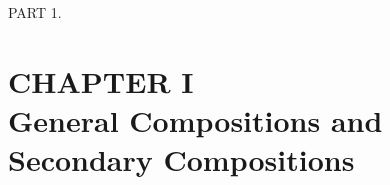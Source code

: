 \documentclass[10pt, leqno]{ltjsarticle}
\numberwithin{equation}{section}
\theoremstyle{plain}
\theoremstyle{definition}
\theoremstyle{remark}
\begin{document}


\begin{center}
  PART 1.
\end{center}

\setcounter{section}{1}

\section*{CHAPTER I\\ General Compositions and Secondary Compositions}
\end{document}
